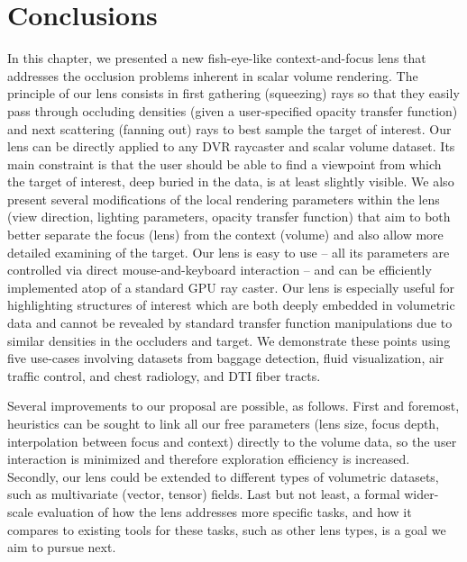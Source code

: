 \section{Conclusions}
\label{sec:conclusions}
%
In this chapter, we presented a new fish-eye-like context-and-focus lens that addresses the occlusion problems inherent in scalar volume rendering. The principle of our lens consists in first gathering (squeezing) rays so that they easily pass through occluding densities (given a user-specified opacity transfer function) and next scattering (fanning out) rays to best sample the target of interest. Our lens can be directly applied to any DVR raycaster and scalar volume dataset. Its main constraint is that the user should be able to find a viewpoint from which the target of interest, deep buried in the data, is at least slightly visible. We also present several modifications of the local rendering parameters within the lens (view direction, lighting parameters, opacity transfer function) that aim to both better separate the focus (lens) from the context (volume) and also allow more detailed examining of the target. Our lens is easy to use -- all its parameters are controlled via direct mouse-and-keyboard interaction -- and can be efficiently implemented atop of a standard GPU ray caster. Our lens is especially useful for highlighting structures of interest which are both deeply embedded in volumetric data and cannot be revealed by standard transfer function manipulations due to similar densities in the occluders and target. We demonstrate these points using five use-cases involving datasets from baggage detection, fluid visualization, air traffic control, and chest radiology, and DTI fiber tracts.

Several improvements to our proposal are possible, as follows. First and foremost, heuristics can be sought to link all our free parameters (lens size, focus depth, interpolation between focus and context) directly to the volume data, so the user interaction is minimized and therefore exploration efficiency is increased. Secondly, our lens could be extended to different types of volumetric datasets, such as multivariate (vector, tensor) fields. Last but not least, a formal wider-scale evaluation of how the lens addresses more specific tasks, and how it compares to existing tools for these tasks, such as other lens types, is a goal we aim to pursue next.